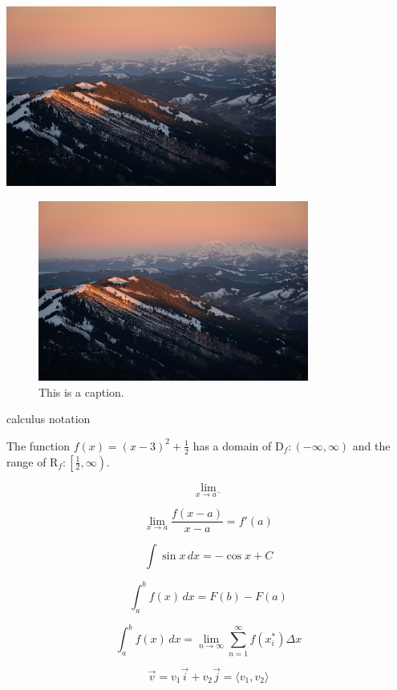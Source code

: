 \documentclass[10pt, letterpaper]{article}
\begin{document}
\begin{center}
    \includegraphics[width=3.5in]{1.jpg}
\end{center}

\begin{figure}[H]
    \centering
    \includegraphics[width=3.5in]{1.jpg}
    \caption{This is a caption.}
\end{figure}


calculus notation

The function $f(x)=(x-3)^2+\frac{1}2{}$ has a domain of $\mathrm{D}_f:(-\infty, \infty)$ and the range of $\mathrm{R}_f:\left[\frac{1}2, \infty\right)$. %

$$\lim \limits_{x \to a^-}$$

$$\displaystyle{\lim \limits_{x \to a} \frac{f(x-a)}{x-a} = f'(a)}$$

$$\displaystyle{\int \sin x \, dx = - \cos x + C}$$

$$\displaystyle{\int_a^b f(x) \, dx = F(b) - F(a)}$$

$$\displaystyle{\int_a^b f(x) \, dx = \lim \limits_{n \to \infty} \sum_{n=1}^\infty f(x_i^*) \Delta x}$$

$$\displaystyle{\vec{v} = v_1\vec{i} + v_2\vec{j} = \langle v_1, v_2\rangle }$$

\end{document}
